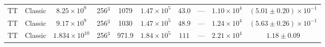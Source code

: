 \documentclass[aps, pre, onecolumn, nofootinbib, notitlepage, groupedaddress, amsfonts, amssymb, amsmath, longbibliography, superscriptaddress]{revtex4-1}
\begin{document}
\begin{table}[ht]
\begin{center}
{\begin{tabular}{c c c c c c c c c c}
TT	&	Classic		&	$8.25 \times 10^9$		&	256$^3$				&	1079		&	$1.47 \times 10^5$	&	$43.0$			&	---		&	$1.10 \times 10^4$  & $(5.01 \pm 0.20) \times 10^{-1}$ \\
TT	&	Classic		&	$9.17 \times 10^9$		&	256$^3$				&	1030		&	$1.47 \times 10^5$	&	$48.9$			&	---		&	$1.24 \times 10^4$  & $(5.63 \pm 0.26) \times 10^{-1}$ \\
TT	&	Classic		&	$1.834 \times 10^{10}$	&	256$^3$				&	971.9		&	$1.84 \times 10^5$	&	$111$			&	---		&	$2.21 \times 10^4$  & $1.18 \pm 0.09$ \\
\hline																	
\end{tabular}
}
\end{center}
\end{table}
\end{document}
